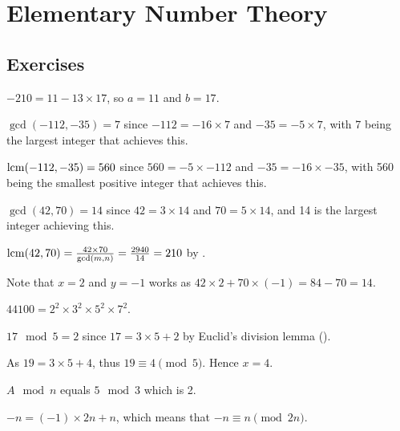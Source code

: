 \section{Elementary Number Theory}
\subsection*{Exercises}
\begin{questions}
    \item $-210 = 11 - 13 \times 17$, so $a = 11$ and $b = 17$.

    \item $\gcd(-112, -35) = 7$ since $-112 = -16 \times 7$ and $-35 = -5 \times 7$, with 7 being the largest integer that achieves this.

    \item $\mathrm{lcm}(-112, -35) = 560$ since $560 = -5 \times -112$ and $-35 = -16 \times -35$, with 560 being the smallest positive integer that achieves this.

    \item \begin{partquestions}{\roman*}
        \item $\gcd(42, 70) = 14$ since $42 = 3 \times 14$ and $70 = 5 \times 14$, and 14 is the largest integer achieving this.

        \item $\mathrm{lcm}(42, 70) = \frac{42 \times 70}{\gcd(m, n)} = \frac{2940}{14} = 210$ by .

        \item Note that $x = 2$ and $y = -1$ works as $42 \times 2 + 70 \times (-1) = 84 - 70 = 14$.
    \end{partquestions}

    \item $44100 = 2^2 \times 3^2 \times 5^2 \times 7^2$.

    \item \begin{partquestions}{\alph*}
        \item $17 \mod 5 = 2$ since $17 = 3 \times 5 + 2$ by Euclid's division lemma ().
        \item As $19 = 3 \times 5 + 4$, thus $19 \equiv 4 \pmod 5$. Hence $x = 4$.
        \item $A \mod n$ equals $5 \mod 3$ which is 2.
    \end{partquestions}

    \item $-n = (-1) \times 2n + n$, which means that $-n \equiv n \pmod{2n}$.


\end{questions}
